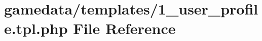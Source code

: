 \hypertarget{1__user__profile_8tpl_8php}{\section{gamedata/templates/1\+\_\+user\+\_\+profile.tpl.\+php File Reference}
\label{1__user__profile_8tpl_8php}
}
